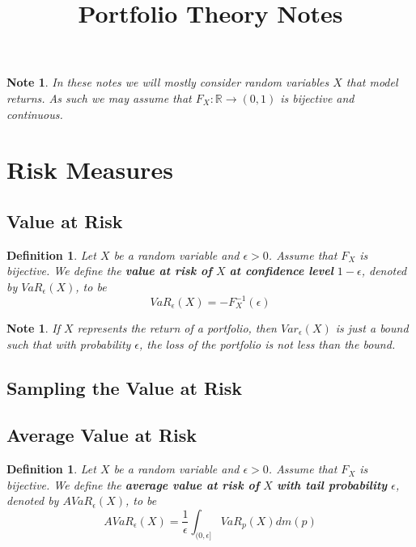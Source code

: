 \documentclass[12pt]{amsart}
\newtheorem{defn}[thm]{Definition}
\newtheorem{note}[thm]{Note}
\newcommand{\ep}{\epsilon}
\newcommand{\R}{\mathbb{R}}
\begin{document}
\title{Portfolio Theory Notes}
\maketitle

\tableofcontents

\begin{note}
In these notes we will mostly consider random variables $X$ that model returns. As such we may assume that $F_X:\R \rightarrow (0,1)$ is bijective and continuous. 
\end{note}

\section{Risk Measures}

\subsection{Value at Risk}

\begin{defn}
Let $X$ be a random variable and $\ep>0$. Assume that $F_X$ is bijective. We define the \textbf{value at risk of } $X$ \textbf{at confidence level } $1-\ep$, denoted by $VaR_{\ep}(X)$, to be $$VaR_{\ep}(X) = -F^{-1}_X(\ep)$$
\end{defn}

\begin{note}
If $X$ represents the return of a portfolio, then $Var_{\ep}(X)$ is just a bound such that with probability $\ep$, the loss of the portfolio is not less than the bound.  
\end{note}

\subsection{Sampling the Value at Risk}

\subsection{Average Value at Risk}

 \begin{defn}
Let $X$ be a random variable and $\ep > 0$. Assume that $F_X$ is bijective. We define the \textbf{average value at risk of } $X$ \textbf{with tail probability } $\ep$, denoted by $AVaR_{\ep}(X)$, to be $$AVaR_{\ep}(X) = \frac{1}{\ep}\int_{(0,\ep]}VaR_p(X)dm(p)$$
\end{defn}
\end{document}
